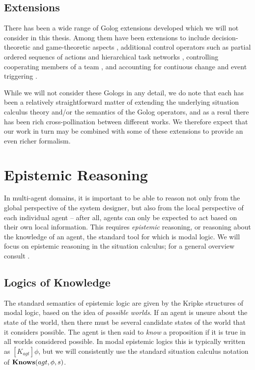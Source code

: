 \subsection{Extensions}

There has been a wide range of Golog extensions developed which we
will not consider in this thesis. Among them have been extensions
to include decision-theoretic \citep{boutilier00dtgolog} and game-theoretic
aspects \citep{finzi03gtgolog,finzi05pogtgolog}, additional control
operators such as partial ordered sequencs of actions \citep{son00htn_golog}
and hierarchical task networks \citep{Gabaldon02htn_in_golog,Son04golog+htn+time},
controlling cooperating members of a team \citep{farinelli07team_golog},
and accounting for contiuous change and event triggering \citep{grosskreutz00ccgolog}.

While we will not consider these Gologs in any detail, we do note
that each has been a relatively straightforward matter of extending
the underlying situation calculus theory and/or the semantics of the
Golog operators, and as a resul there has been rich cross-pollination
between different works. We therefore expect that our work in turn
may be combined with some of these extensions to provide an even richer
formalism.


\section{Epistemic Reasoning\label{sec:Background:Epistemic-Reasoning}}

In multi-agent domains, it is important to be able to reason not only
from the global perspective of the system designer, but also from
the local perspective of each individual agent -- after all, agents
can only be expected to act based on their own local information.
This requires \emph{epistemic} reasoning, or reasoning about the knowledge
of an agent, the standard tool for which is modal logic. We will focus
on epistemic reasoning in the situation calculus; for a general overview
consult \citep{fagin95}.


\subsection{Logics of Knowledge}

The standard semantics of epistemic logic are given by the Kripke
structures of modal logic, based on the idea of \emph{possible worlds}.
If an agent is unsure about the state of the world, then there must
be several candidate states of the world that it considers possible.
The agent is then said to \emph{know }a proposition if it is true
in all worlds considered possible. In modal epistemic logics this
is typically written as $[K_{agt}]\phi$, but we will consistently
use the standard situation calculus notation of $\mathbf{Knows}(agt,\phi,s)$.

